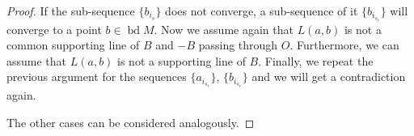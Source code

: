\documentclass[10pt,a4paper]{amsart}
\newcommand{\bd}{\operatorname*{bd}}
\begin{document}
\begin{proof}
              If the sub-sequence $\{b_{i_s}\}$ does not converge, a sub-sequence 
              of it $\{b_{i_{s_{r}}}\}$ will converge to a point $b\in \bd M$. Now we 
              assume again that $L(a,b)$ is not a common supporting line of $B$ 
              and $-B$ passing through $O$. Furthermore, we can assume that 
              $L(a,b)$ is not a supporting line of $B$. Finally, we repeat the 
              previous argument for the sequences 
              $\{a_{i_{s_{r}}}\}$, $\{b_{i_{s_{r}}}\}$ and we will get a contradiction 
              again.
 
              The other cases can be considered analogously.
 \end{proof}
\end{document}

